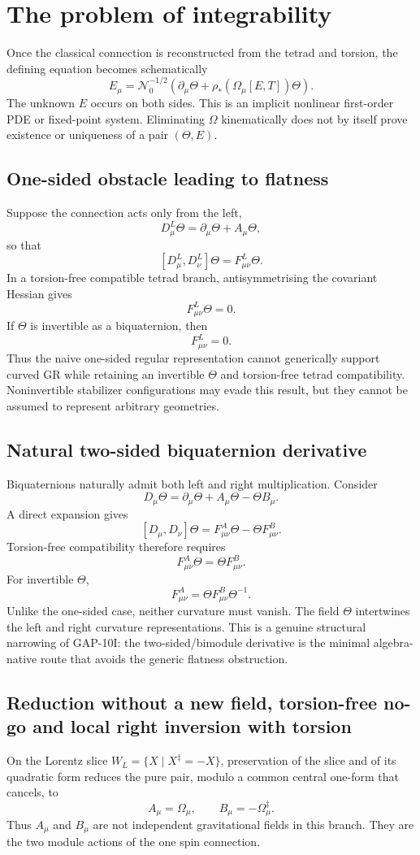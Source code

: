 \section{The problem of integrability}
Once the classical connection is reconstructed from the tetrad and torsion,
the defining equation becomes schematically
\[
 E_\mu=\mathcal N_0^{-1/2}
 \left(\partial_\mu\Theta+\rho_*(\Omega_\mu[E,T])\Theta\right).
\]
The unknown $E$ occurs on both sides.  This is an implicit nonlinear first-order
PDE or fixed-point system.  Eliminating $\Omega$ kinematically does not by
itself prove existence or uniqueness of a pair $(\Theta,E)$.

\subsection{One-sided obstacle leading to flatness}
Suppose the connection acts only from the left,
\[
 D^L_\mu\Theta=\partial_\mu\Theta+A_\mu\Theta,
\]
so that
\[
 [D^L_\mu,D^L_\nu]\Theta=F^L_{\mu\nu}\Theta.
\]
In a torsion-free compatible tetrad branch, antisymmetrising the covariant
Hessian gives
\[
 F^L_{\mu\nu}\Theta=0.
\]
If $\Theta$ is invertible as a biquaternion, then
\[
 F^L_{\mu\nu}=0.
\]
Thus the naive one-sided regular representation cannot generically support
curved GR while retaining an invertible $\Theta$ and torsion-free tetrad
compatibility.  Noninvertible stabilizer configurations may evade this result,
but they cannot be assumed to represent arbitrary geometries.

\subsection{Natural two-sided biquaternion derivative}
Biquaternions naturally admit both left and right multiplication.  Consider
\[
 \boxed{
 D_\mu\Theta=\partial_\mu\Theta+A_\mu\Theta-\Theta B_\mu.}
\]
A direct expansion gives
\[
 \boxed{
 [D_\mu,D_\nu]\Theta
 =F^A_{\mu\nu}\Theta-\Theta F^B_{\mu\nu}.}
\]
Torsion-free compatibility therefore requires
\[
 F^A_{\mu\nu}\Theta=\Theta F^B_{\mu\nu}.
\]
For invertible $\Theta$,
\[
 \boxed{
 F^A_{\mu\nu}=\Theta F^B_{\mu\nu}\Theta^{-1}.}
\]
Unlike the one-sided case, neither curvature must vanish.  The field $\Theta$
intertwines the left and right curvature representations.  This is a genuine
structural narrowing of GAP-10I: the two-sided/bimodule derivative is the
minimal algebra-native route that avoids the generic flatness obstruction.

\subsection{Reduction without a new field, torsion-free no-go and local right inversion with torsion}
On the Lorentz slice $W_L=\{X\mid X^\ddagger=-X\}$, preservation of the slice
and of its quadratic form reduces the pure pair, modulo a common central
one-form that cancels, to
\[
 \boxed{A_\mu=\Omega_\mu,\qquad B_\mu=-\Omega_\mu^\ddagger.}
\]
Thus $A_\mu$ and $B_\mu$ are not independent gravitational fields in this
branch.  They are the two module actions of the one spin connection.

